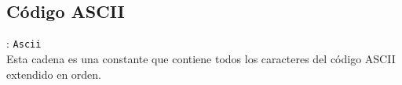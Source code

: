       \begin{fxcode}
         \\
         \\
      \end{fxcode}
      
      \subsection*{Código ASCII}: \texttt{Ascii}\\
      Esta cadena es una constante que contiene todos los caracteres del código ASCII extendido en orden.
      
